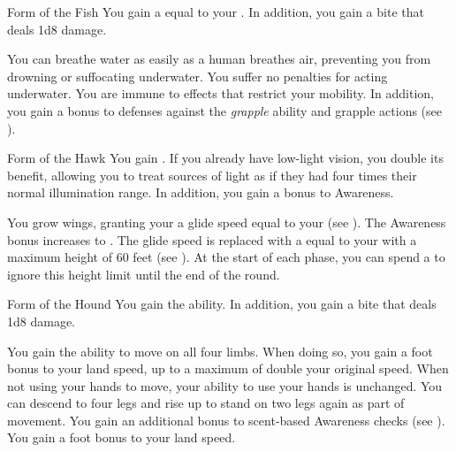 {            \begin{freeability}{Form of the Fish}
                You gain a  equal to your .
                In addition, you gain a bite  that deals 1d8 damage.

                \rankline
                 You can breathe water as easily as a human breathes air, preventing you from drowning or suffocating underwater.
                 You suffer no penalties for acting underwater.
                 You are immune to  effects that restrict your mobility.
                In addition, you gain a  bonus to defenses against the \textit{grapple} ability and grapple actions (see ).
            \end{freeability}

            \begin{freeability}{Form of the Hawk}
                You gain .
                If you already have low-light vision, you double its benefit, allowing you to treat sources of light as if they had four times their normal illumination range.
                In addition, you gain a  bonus to Awareness.

                \rankline
                 You grow wings, granting your a glide speed equal to your  (see ).
                 The Awareness bonus increases to .
                 The glide speed is replaced with a  equal to your  with a maximum height of 60 feet (see ).
                At the start of each phase, you can spend a  to ignore this height limit until the end of the round.
            \end{freeability}

            \begin{freeability}{Form of the Hound}
                You gain the  ability.
                In addition, you gain a bite  that deals 1d8 damage.

                \rankline
                 You gain the ability to move on all four limbs.
                When doing so, you gain a  foot bonus to your land speed, up to a maximum of double your original speed.
                When not using your hands to move, your ability to use your hands is unchanged.
                You can descend to four legs and rise up to stand on two legs again as part of movement.
                 You gain an additional  bonus to scent-based Awareness checks (see ).
                 You gain a  foot bonus to your land speed.
            \end{freeability}

}
